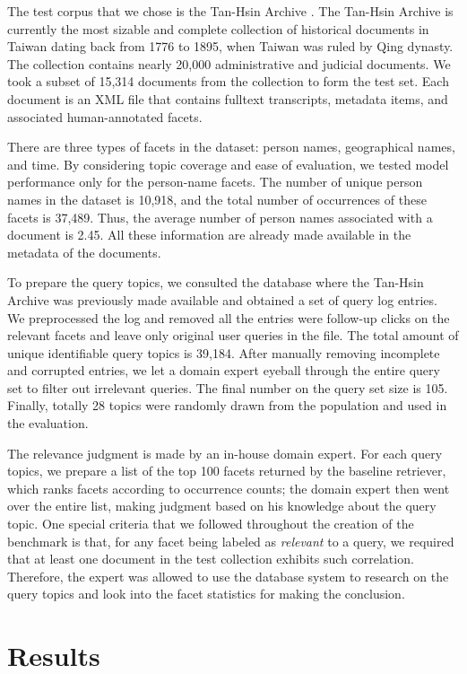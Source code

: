 The test corpus that we chose is the Tan-Hsin Archive .  The
Tan-Hsin Archive is currently the most sizable and complete collection of
historical documents in Taiwan dating back from 1776 to 1895, when Taiwan was
ruled by Qing dynasty.  The collection contains nearly 20,000 administrative
and judicial documents.  We took a subset of 15,314 documents from the
collection to form the test set.  Each document is an XML file that contains
fulltext transcripts, metadata items, and associated human-annotated facets.  

There are three types of facets in the dataset: person names, geographical
names, and time.  By considering topic coverage and ease of evaluation, we
tested model performance only for the person-name facets.  The number of unique
person names in the dataset is 10,918, and the total number of occurrences of
these facets is 37,489.  Thus, the average number of person names associated
with a document is 2.45.  All these information are already made available in
the metadata of the documents.  

To prepare the query topics, we consulted the database where the Tan-Hsin
Archive was previously made available and obtained a set of query log entries.
We preprocessed the log and removed all the entries were follow-up clicks on
the relevant facets and leave only original user queries in the file.  The
total amount of unique identifiable query topics is 39,184.  After manually
removing incomplete and corrupted entries, we let a domain expert eyeball
through the entire query set to filter out irrelevant queries.   The final
number on the query set size is 105.  Finally, totally 28 topics were randomly
drawn from the population and used in the evaluation.

The relevance judgment is made by an in-house domain expert.  For each query
topics, we prepare a list of the top 100 facets returned by the baseline
retriever, which ranks facets according to occurrence counts; the domain expert
then went over the entire list, making judgment based on his knowledge about
the query topic.  One special criteria that we followed throughout the creation
of the benchmark is that, for any facet being labeled as \emph{relevant} to a
query, we required that at least one document in the test collection exhibits
such correlation.  Therefore, the expert was allowed to use the database system
to research on the query topics and look into the facet statistics for making
the conclusion.

\section{Results}\label{s:results}

